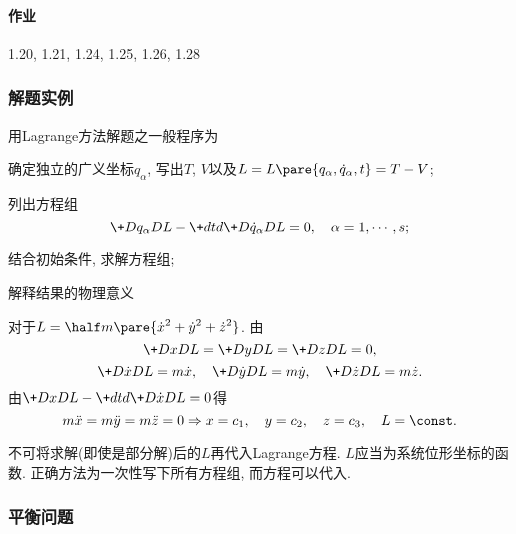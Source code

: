 \documentclass[../LectureNotes.tex]{subfiles}
\begin{document}

\paragraph{作业} %
\label{par:作业}

1.20, 1.21, 1.24, 1.25, 1.26, 1.28



\subsubsection{解题实例} %
\label{ssub:解题实例}

用Lagrange方法解题之一般程序为
\begin{cenum}
    \item 确定独立的广义坐标$q_\alpha$, 写出$T$, $V$以及$L = L\pare{q_\alpha,\dot{q}_\alpha,t} = T-V$;
    \item 列出方程组
    \[ \+D{q_\alpha}D{L} - \+dtd{} \+D{\dot{q}_\alpha}DL = 0,\quad \alpha = 1,\cdots, s; \]
    \item 结合初始条件, 求解方程组;
    \item 解释结果的物理意义
\end{cenum}
\begin{sample}
    \begin{ex}
        对于$L = \displaystyle \half m\pare{\dot{x}^2 + \dot{y}^2 + \dot{z}^2}$. 由
        \[ \+DxDL = \+DyDL = \+DzDL = 0, \]
        \[ \+D{\dot{x}}DL = m\dot{x},\quad \+D{\dot{y}}DL = m\dot{y},\quad \+D{\dot{z}}DL = m\dot{z}. \]
        由$\displaystyle \+DxDL - \+dtd{} \+D{\dot{x}}DL = 0$得
        \[ m\ddot{x} = m\ddot{y} = m\ddot{z} = 0\Rightarrow x = c_1,\quad y=c_2,\quad  z=c_3,\quad L = \const. \]
    \end{ex}
\end{sample}
\begin{pitfall}
    不可将求解(即使是部分解)后的$L$再代入Lagrange方程. $L$应当为系统位形坐标的函数. 正确方法为一次性写下所有方程组, 而方程可以代入.
\end{pitfall}


\subsubsection{平衡问题} %
\label{ssub:平衡问题}
\end{document}
